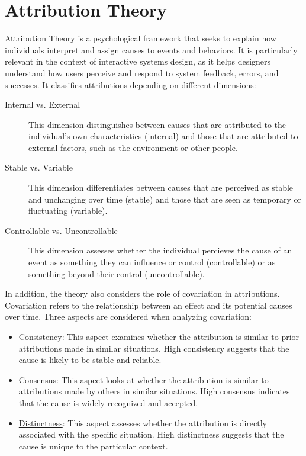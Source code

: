 \section{Attribution Theory}


Attribution Theory is a psychological framework that seeks to explain how individuals interpret and assign causes to events and behaviors. It is particularly relevant in the context of interactive systems design, as it helps designers understand how users perceive and respond to system feedback, errors, and successes. It classifies attributions depending on different dimensions:
\begin{description}
    \item[Internal vs. External] This dimension distinguishes between causes that are attributed to the individual's own characteristics (internal) and those that are attributed to external factors, such as the environment or other people.
    \item[Stable vs. Variable] This dimension differentiates between causes that are perceived as stable and unchanging over time (stable) and those that are seen as temporary or fluctuating (variable).
    \item[Controllable vs. Uncontrollable] This dimension assesses whether the individual percieves the cause of an event as something they can influence or control (controllable) or as something beyond their control (uncontrollable).
\end{description}

In addition, the theory also considers the role of covariation in attributions. Covariation refers to the relationship between an effect and its potential causes over time. Three aspects are considered when analyzing covariation:
\begin{itemize}
    \item \ul{Consistency}: This aspect examines whether the attribution is similar to prior attributions made in similar situations. High consistency suggests that the cause is likely to be stable and reliable.
    \item \ul{Consensus}: This aspect looks at whether the attribution is similar to attributions made by others in similar situations. High consensus indicates that the cause is widely recognized and accepted.
    \item \ul{Distinctness}: This aspect assesses whether the attribution is directly associated with the specific situation. High distinctness suggests that the cause is unique to the particular context.
\end{itemize}

